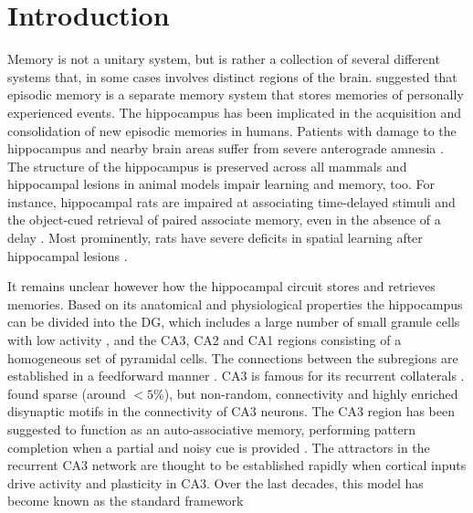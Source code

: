 \documentclass[utf8]{frontiersSCNS} %
\begin{document}
\section{Introduction}
Memory is not a unitary system, but is rather a collection of several different systems that, in some cases involves distinct regions of the brain. \citet{tulving1972episodic} suggested that episodic memory is a separate memory system that stores memories of personally experienced events. The hippocampus has been implicated in the acquisition and consolidation of new episodic memories in humans. Patients with damage to the hippocampus and nearby brain areas suffer from severe anterograde amnesia \citep{scoville1957loss, milner1968further}. The structure of the hippocampus is preserved across all mammals \citep{allen2013evolution} and hippocampal lesions in animal models impair learning and memory, too. For instance, hippocampal rats are impaired at associating time-delayed stimuli \citep{gluck2001gateway} and the object-cued retrieval of paired associate memory, even in the absence of a delay \citep{yoon2012hippocampus}. Most prominently, rats have severe deficits in spatial learning after hippocampal lesions \citep{morris1982place}.

It remains unclear however how the hippocampal circuit stores and retrieves memories. Based on its anatomical and physiological properties the hippocampus can be divided into the DG, which includes a large number of small granule cells with low activity \citep{leutgeb2007pattern}, and the CA3, CA2 and CA1 regions consisting of a homogeneous set of pyramidal cells. The connections between the subregions are established in a feedforward manner \citep{amaral1990chapter}. CA3 is famous for its recurrent collaterals \citep{ishizuka1990organization, li1994hippocampal}. \citet{guzman2016synaptic} found sparse (around $<5\%$), but non-random, connectivity and highly enriched disynaptic motifs in the connectivity of CA3 neurons. 
%
The CA3 region has been suggested to function as an auto-associative memory, performing pattern completion when a partial and noisy cue is provided \citep{marr1991simple, mcnaughton1987hippocampal, treves1994computational, o1994hippocampal, rolls2007attractor, guzman2016synaptic}. The attractors in the recurrent CA3 network are thought to be established rapidly when cortical inputs drive activity and plasticity in CA3. Over the last decades, this model has become known as the standard framework %
\end{document}
